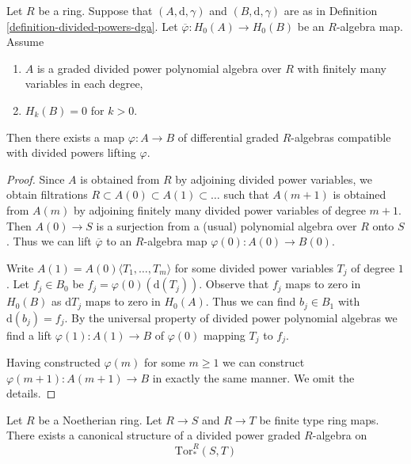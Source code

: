 \begin{lemma}
\label{lemma-uniqueness-tate-resolution}
Let $R$ be a ring. Suppose that $(A, \text{d}, \gamma)$ and
$(B, \text{d}, \gamma)$ are as in
Definition \ref{definition-divided-powers-dga}.
Let $\overline{\varphi} : H_0(A) \to H_0(B)$ be an $R$-algebra map.
Assume
\begin{enumerate}
\item $A$ is a graded divided power polynomial algebra over $R$
with finitely many variables in each degree,
\item $H_k(B) = 0$ for $k > 0$.
\end{enumerate}
Then there exists a map $\varphi : A \to B$ of differential
graded $R$-algebras compatible with divided powers
lifting $\varphi$.
\end{lemma}

\begin{proof}
Since $A$ is obtained from $R$ by adjoining
divided power variables, we obtain filtrations
$R \subset A(0) \subset A(1) \subset \ldots$
such that $A(m + 1)$ is obtained from $A(m)$ by adjoining finitely many
divided power variables of degree $m + 1$.
Then $A(0) \to S$ is a surjection from a (usual) polynomial
algebra over $R$ onto $S$. Thus we can lift $\overline{\varphi}$
to an $R$-algebra map $\varphi(0) : A(0) \to B(0)$.

\medskip\noindent
Write $A(1) = A(0)\langle T_1, \ldots, T_m\rangle$ for some
divided power variables $T_j$ of degree $1$. Let $f_j \in B_0$
be $f_j = \varphi(0)(\text{d}(T_j))$. Observe that $f_j$
maps to zero in $H_0(B)$ as $\text{d}T_j$ maps to zero in $H_0(A)$.
Thus we can find $b_j \in B_1$ with $\text{d}(b_j) = f_j$.
By the universal property of divided power polynomial algebras
we find a lift $\varphi(1) : A(1) \to B$ of $\varphi(0)$
mapping $T_j$ to $f_j$.

\medskip\noindent
Having constructed $\varphi(m)$ for some $m \geq 1$ we can construct
$\varphi(m + 1) : A(m + 1) \to B$ in exactly the same manner.
We omit the details.
\end{proof}

\begin{lemma}
\label{lemma-divided-powers-on-tor}
Let $R$ be a Noetherian ring. Let $R \to S$ and $R \to T$ be
finite type ring maps. There exists a canonical structure
of a divided power graded $R$-algebra on
$$
\text{Tor}_*^R(S, T)
$$
\end{lemma}

